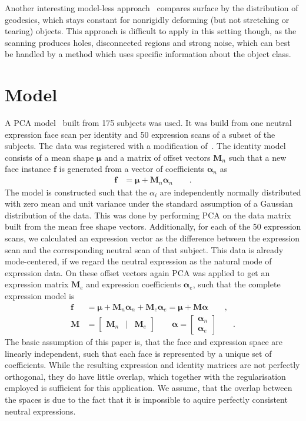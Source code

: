 \documentclass[10pt,twocolumn,letterpaper]{article}
\newcommand{\Matrix}[1]{\begin{bmatrix} #1 \end{bmatrix}}
\newcommand*{\MAT}[1]  {\ensuremath{\mathbf{#1}}}
\newcommand*{\VEC}[1]  {\ensuremath{\bm{#1}}}
\begin{document}
Another interesting model-less approach~\cite{bronstein05:face_rec} compares
surface by the distribution of geodesics, which stays constant for nonrigidly
deforming (but not stretching or tearing) objects.  This approach is difficult
to apply in this setting though, as the scanning produces holes, disconnected
regions and strong noise, which can best be handled by a method which uses
specific information about the object class.
			  
\section{Model}
A PCA model~\cite{blanz:model} built from 175 subjects was used. It was build
from one neutral expression face scan per identity and 50 expression scans of a
subset of the subjects. The data was registered with a modification
of~\cite{amberg07:nicp}.
The identity model consists of a mean shape $\VEC\mu$ and a matrix of offset
vectors $\MAT M_n$ such that a new face instance $\VEC f$ is generated from a
vector of coefficients $\VEC\alpha_n$ as
\begin{align}
  \VEC f&=\VEC\mu + \MAT M_n\VEC\alpha_n\qquad.
\end{align}
The model is constructed such that the $\alpha_i$ are independently normally
distributed with zero mean and unit variance under the standard assumption of a
Gaussian distribution of the data. This was done by performing PCA
on the data matrix built from the mean free shape vectors.
Additionally, for each of the 50 expression scans, we calculated an expression
vector as the difference between the expression scan and the corresponding
neutral scan of that subject.
This data is already mode-centered, if we regard the neutral
expression as the natural mode of expression data. On these offset vectors
again PCA was applied to get an expression matrix $\MAT M_e$ and 
expression coefficients $\VEC\alpha_e$, such that the complete expression model is
\begin{align}
  \VEC f&=\VEC\mu + \MAT M_n\VEC\alpha_n + \MAT M_e\VEC\alpha_e
         =\VEC\mu + \MAT M\VEC\alpha\qquad,\\
  \MAT M &= \Matrix{\MAT M_n &|& \MAT M_e} \qquad \VEC\alpha = \Matrix{\VEC\alpha_n \\ \VEC\alpha_e}\qquad.
\end{align}
The basic assumption of this paper is, that the face and expression space are
linearly independent, such that each face is represented by a unique set of
coefficients.  While the resulting expression and identity matrices are not
perfectly orthogonal, they do have little overlap, which together with the
regularisation employed is sufficient for this application. We assume, that the
overlap between the spaces is due to the fact that it is impossible to aquire
perfectly consistent neutral expressions.
\end{document}
